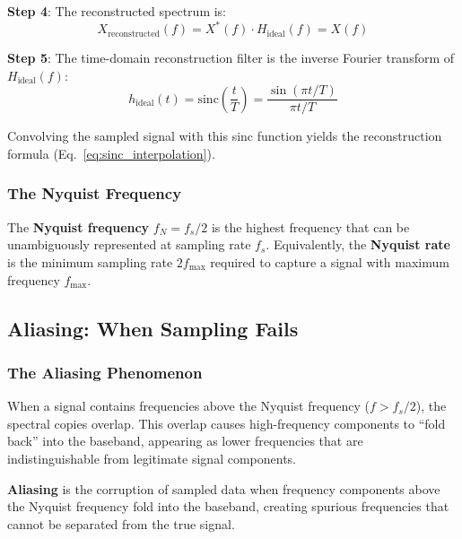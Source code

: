 \textbf{Step 4}: The reconstructed spectrum is:
\begin{equation}
X_{\text{reconstructed}}(f) = X^*(f) \cdot H_{\text{ideal}}(f) = X(f)
\label{eq:reconstruction_spectrum}
\end{equation}

\textbf{Step 5}: The time-domain reconstruction filter is the inverse Fourier transform of $H_{\text{ideal}}(f)$:
\begin{equation}
h_{\text{ideal}}(t) = \mathrm{sinc}\left(\frac{t}{T}\right) = \frac{\sin(\pi t / T)}{\pi t / T}
\label{eq:sinc_impulse}
\end{equation}

Convolving the sampled signal with this sinc function yields the reconstruction formula (Eq.~\ref{eq:sinc_interpolation}).

\subsubsection{The Nyquist Frequency}

The \textbf{Nyquist frequency} $f_N = f_s/2$ is the highest frequency that can be unambiguously represented at sampling rate $f_s$. Equivalently, the \textbf{Nyquist rate} is the minimum sampling rate $2f_{\max}$ required to capture a signal with maximum frequency $f_{\max}$.

\subsection{Aliasing: When Sampling Fails}
\label{subsec:aliasing}

\subsubsection{The Aliasing Phenomenon}

When a signal contains frequencies above the Nyquist frequency ($f > f_s/2$), the spectral copies overlap. This overlap causes high-frequency components to ``fold back'' into the baseband, appearing as lower frequencies that are indistinguishable from legitimate signal components.

\begin{definition}[Aliasing]
\textbf{Aliasing} is the corruption of sampled data when frequency components above the Nyquist frequency fold into the baseband, creating spurious frequencies that cannot be separated from the true signal.
\end{definition}

